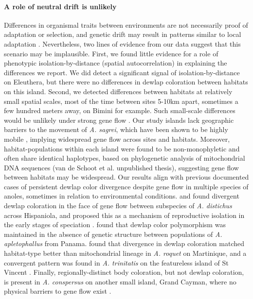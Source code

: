 \paragraph{A role of neutral drift is unlikely} Differences in organismal traits between environments are not necessarily proof of adaptation or selection, and genetic drift may result in patterns similar to local adaptation \citep{Miles2019}. Nevertheless, two lines of evidence from our data suggest that this scenario may be implausible. First, we found little evidence for a role of phenotypic isolation-by-distance (spatial autocorrelation) in explaining the differences we report. We did detect a significant signal of isolation-by-distance on Eleuthera, but there were no differences in dewlap coloration between habitats on this island. Second, we detected differences between habitats at relatively small spatial scales, most of the time between sites 5-10km apart, sometimes a few hundred meters away, on Bimini for example. Such small-scale differences would be unlikely under strong gene flow \citep{Richardson2014}. Our study islands lack geographic barriers to the movement of \textit{A. sagrei}, which have been shown to be highly mobile \citep{Kamath2018}, implying widespread gene flow across sites and habitats. Moreover, habitat-populations within each island were found to be non-monophyletic and often share identical haplotypes, based on phylogenetic analysis of mitochondrial DNA sequences (van de Schoot et al. unpublished thesis), suggesting gene flow between habitats may be widespread. Our results align with previous documented cases of persistent dewlap color divergence despite gene flow in multiple species of anoles, sometimes in relation to environmental conditions. \citet{Ng2012} and \citet{Ng2016} found divergent dewlap coloration in the face of gene flow between subspecies of \textit{A. distichus} across Hispaniola, and proposed this as a mechanism of reproductive isolation in the early stages of speciation \citep{Ng2011, Lambert2013, Ng2017}. \citet{Stapley2011} found that dewlap color polymorphism was maintained in the absence of genetic structure between populations of \textit{A. apletophallus} from Panama. \citet{Thorpe2002a} found that divergence in dewlap coloration matched habitat-type better than mitochondrial lineage in \textit{A. roquet} on Martinique, and a convergent pattern was found in \textit{A. trinitatis} on the featureless island of St Vincent \citep{Thorpe2002b}. Finally, regionally-distinct body coloration, but not dewlap coloration, is present in \textit{A. conspersus} on another small island, Grand Cayman, where no physical barriers to gene flow exist \citep{Macedonia2001}.

